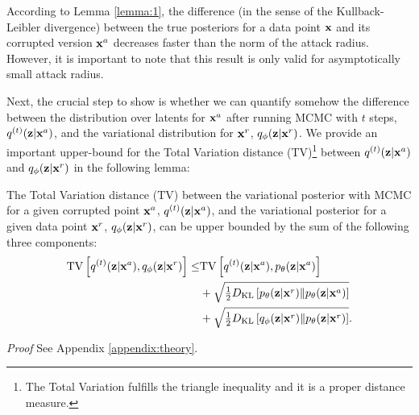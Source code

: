 According to Lemma \ref{lemma:1}, the difference (in the sense of the Kullback-Leibler divergence) between the true posteriors for a data point ${\mathbf{x}}$ and its corrupted version ${\mathbf{x}}^{a}$ decreases faster than the norm of the attack radius. However, it is important to note that this result is only valid for asymptotically small attack radius.

Next, the crucial step to show is whether we can quantify somehow the difference between the distribution over latents for ${\mathbf{x}}^a$ after running MCMC with $t$ steps, $q^{(t)}({\mathbf{z}}|{\mathbf{x}}^a)$, and the variational distribution for ${\mathbf{x}}^r$, $q_{\phi}({\mathbf{z}}|{\mathbf{x}}^r)$. 
We provide an important upper-bound for the Total Variation distance (TV)\footnote{The Total Variation fulfills the triangle inequality and it is a proper distance measure.} between $q^{(t)}({\mathbf{z}}|{\mathbf{x}}^a)$ and $q_{\phi}({\mathbf{z}}|{\mathbf{x}}^r)$ in the following lemma:

\begin{lemma}\label{lemma:2}
The Total Variation distance ($\mathrm{TV}$) between the variational posterior with MCMC for a given corrupted point ${\mathbf{x}}^a$, $q^{(t)}({\mathbf{z}}|{\mathbf{x}}^a)$, and the variational posterior for a given data point ${\mathbf{x}}^r$, $q_{\phi}({\mathbf{z}}|{\mathbf{x}}^r)$, can be upper bounded by the sum of the following three components:
\begin{align}
{\mathrm{TV}\left[q^{(t)}({\mathbf{z}}|{\mathbf{x}}^a) ,q_{\phi}({\mathbf{z}}|{\mathbf{x}}^r) \right]}
\leq &
    {\mathrm{TV}\left[q^{(t)}({\mathbf{z}}|{\mathbf{x}}^a) ,p_{\theta}({\mathbf{z}}|{\mathbf{x}}^a) \right]} \notag\\
    &+ 
    \sqrt{\tfrac12 D_{\mathrm{KL}}\left[ p_{\theta}({\mathbf{z}}|{\mathbf{x}}^r)\|p_{\theta}({\mathbf{z}}|{\mathbf{x}}^a)\right] } \notag\\
    &+
   \sqrt{\tfrac12  D_{\mathrm{KL}}\left[q_{\phi}({\mathbf{z}}|{\mathbf{x}}^r)\|p_{\theta}({\mathbf{z}}|{\mathbf{x}}^r)\right] }.
\end{align}
\end{lemma}
\textit{Proof} See Appendix \ref{appendix:theory}.

